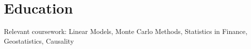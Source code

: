 \section*{Education}
\small Relevant coursework: Linear Models, Monte Carlo Methods, Statistics in Finance, Geostatistics, Causality
